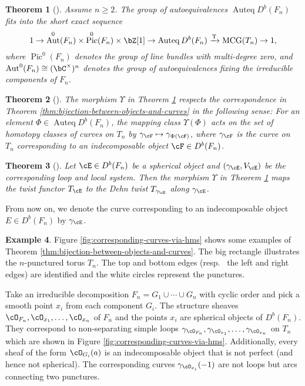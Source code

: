 \documentclass[12pt]{amsart}
\numberwithin{equation}{section}
\theoremstyle{plain}
\newtheorem{theorem}{Theorem}[section]
\theoremstyle{definition}
\newtheorem{example}[theorem]{Example}
\DeclareMathOperator{\Auteq}{\mathrm{Auteq}}
\DeclareMathOperator{\Pic}{\mathrm{Pic}}
\DeclareMathOperator{\MCG}{\mathrm{MCG}}
\DeclareMathOperator{\Aut}{\mathrm{Aut}}
\begin{document}
\begin{theorem}[{\cite[Theorem D]{opper2023spherical}}]\label{thm:autoequivalence-of-I_n-curve}
    Assume $n \geq 2$.
    The group of autoequivalences $\Auteq{D^b(F_n)}$ fits into the short exact sequence
    \begin{equation}
        1 \to \Aut^0(F_n) \times \Pic^0(F_n) \times \bZ[1] \to \Auteq{D^b(F_n)} \xrightarrow{\Upsilon} \MCG(T_n) \to 1,
    \end{equation}
    where $\Pic^0(F_n)$ denotes the group of line bundles with multi-degree zero, and $\Aut^0(F_n) \cong (\bC^\times)^n$ denotes the group of autoequivalences fixing the irreducible components of $F_n$.
\end{theorem}
\begin{theorem}[{\cite[Corollary 7.37]{opper2023spherical}}]\label{thm:definition-of-upsilon}
    The morphism $\Upsilon$ in Theorem \ref{thm:autoequivalence-of-I_n-curve} respects the correspondence in Theorem \ref{thm:bijection-between-objects-and-curves} in the following sense:
    For an element $\Phi \in \Auteq{D^b(F_n)}$, the mapping class $\Upsilon(\Phi)$ acts on the set of homotopy classes of curves on $T_n$ by $\gamma_{\cF} \mapsto \gamma_{\Phi(\cF)}$, where $\gamma_{\cF}$ is the curve on $T_n$ corresponding to an indecomposable object $\cF \in D^b(F_n)$.
\end{theorem}
\begin{theorem}[{\cite[Theorem 5.9]{opper2023spherical}}]\label{thm:spherical-twist-and-dehn-twist}
    Let $\cE \in D^b(F_n)$ be a spherical object and $(\gamma_{\cE}, V_{\cE})$ be the corresponding loop and local system. Then the morphism $\Upsilon$ in Theorem \ref{thm:autoequivalence-of-I_n-curve} maps the twist functor $T_{\cE}$ to the Dehn twist $T_{\gamma_{\cE}}$ along $\gamma_{\cE}$.
\end{theorem}

From now on, we denote the curve corresponding to an indecomposable object $E \in D^b(F_n)$ by $\gamma_{\cE}$.


\begin{example}
    Figure \ref{fig:corresponding-curves-via-hms} shows some examples of Theorem \ref{thm:bijection-between-objects-and-curves}.
    The big rectangle illustrates the $n$-punctured torus $T_n$.
    The top and bottom edges (resp.~ the left and right edges) are identified and the white circles represent the punctures.

    Take an irreducible decomposition $F_n = G_1 \cup \cdots \cup G_n$ with cyclic order and pick a smooth point $x_i$ from each component $G_i$.
    The structure sheaves $\cO_{F_n}, \cO_{x_1}, \dots, \cO_{x_n}$ of $F_n$ and the points $x_i$ are spherical objects of $D^b(F_n)$.
    They correspond to non-separating simple loops $\gamma_{\cO_{F_n}}, \gamma_{\cO_{x_1}}, \dots, \gamma_{\cO_{x_n}}$ on $T_n$ which are shown in Figure \ref{fig:corresponding-curves-via-hms}.
    Additionally, every sheaf of the form $\cO_{G_i}(a)$ is an indecomposable object that is not perfect (and hence not spherical).
    The corresponding curves $\gamma_{\cO_{x_i}}(-1)$ are not loops but arcs connecting two punctures.
\end{example}
\end{document}
